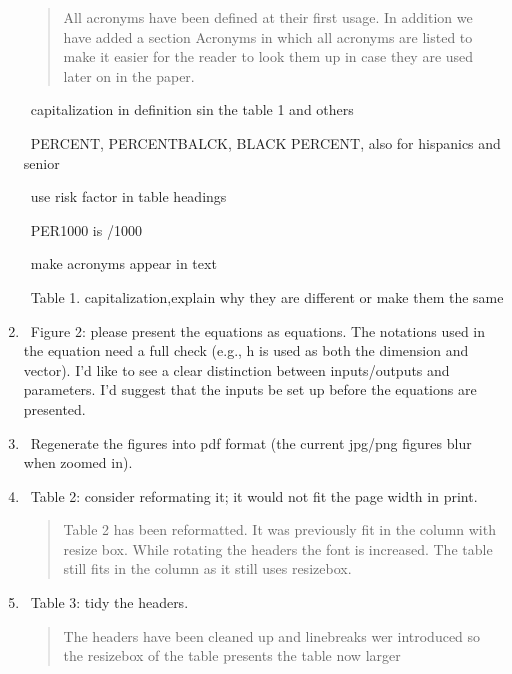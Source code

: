 \documentclass[12pt]{article}
\theoremstyle{definition}
\renewcommand{\_}{%
    \textunderscore\hspace{0pt}%
}
\newcommand{\DONE}{{\color{green!60!black}\makebox[0pt][l]{$\square$}\raisebox{.15ex}{\hspace{0.1em}$\checkmark$}}~}
\newcommand{\DOIT}{{\color{red!60!black}\makebox[0pt][l]{$\square$}\raisebox{.15ex}{\hspace{0.1em}$\boxtimes}}~}
\begin{document}
\begin{enumerate}
\begin{quote}
    All acronyms have been defined at their first usage. In addition we have added a section Acronyms in which all acronyms are listed to make it easier for the reader to look them up in case they are used later on in the paper.
\end{quote}

\DOIT capitalization in definition sin the table 1 and others

\DOIT PERCENT, PERCENTBALCK, BLACK PERCENT, also for hispanics and senior

\DOIT use risk factor in table headings

\DOIT PER1000 is /1000

\DOIT make acronyms appear in text

\DOIT Table 1. capitalization,explain why they are different or make them the same


\item \DOIT  Figure 2: please present the equations as equations. The notations used in the equation need a full check (e.g., h is used as both the dimension and vector). I'd like to see a clear distinction between inputs/outputs and parameters. I'd suggest that the inputs be set up before the equations are presented.

\begin{quote}
\end{quote}

\item \DOIT  Regenerate the figures into pdf format (the current jpg/png figures blur when zoomed in).

\begin{quote}
\end{quote}

\item \DONE  Table 2: consider reformating it; it would not fit the page width in print.

\begin{quote}
Table 2 has been reformatted. It was previously fit in the column with resize box. While rotating the headers the font is increased. The table still fits in the column as it still uses resizebox.
\end{quote}


\item \DONE  Table 3: tidy the headers.

\begin{quote}
    The headers have been cleaned up and linebreaks wer introduced so the resizebox of the table presents the table now larger
\end{quote}


\end{enumerate}
\end{document}
